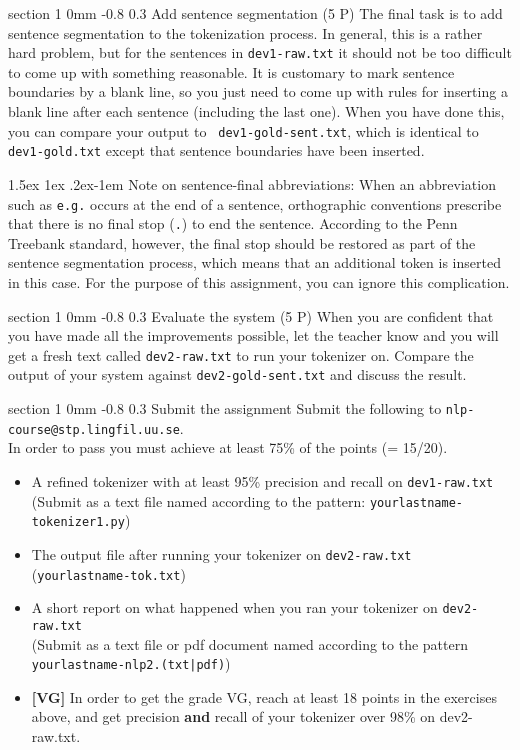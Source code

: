 \documentclass[11pt]{article}
\makeatletter
\newcommand{\newsec}[2]{\section{#1}\label{sec:#2}\noindent}
\renewcommand{\section}{\@startsection
{section}%
{1}%
{0mm}%
{-0.8\baselineskip}%
{0.3\baselineskip}%
{\bfseries\large}}%
\renewcommand{\paragraph}{%
  \@startsection{paragraph}{4}%
  {\z@}{1.5ex \@plus 1ex \@minus .2ex}{-1em}%
  {\normalfont\normalsize\bfseries}%
}\makeatother
\makeatother
\begin{document}
\newsec{Add sentence segmentation (5 P)}{sent}%
The final task is to add sentence segmentation to the tokenization
process. In general, this is a rather hard problem, but for the
sentences in {\tt dev1-raw.txt} it should not be too difficult to come
up with something reasonable. It is customary to mark sentence
boundaries by a blank line, so you just need to come up with rules for
inserting a blank line after each sentence (including the last
one). When you have done this, you can compare your output to {\tt
  dev1-gold-sent.txt}, which is identical to {\tt dev1-gold.txt}
except that sentence boundaries have been inserted.

\paragraph{Note on sentence-final abbreviations:} When an abbreviation
such as {\tt e.g.} occurs at the end of a sentence, orthographic
conventions prescribe that there is no final stop ({\tt .}) to end the
sentence. According to the Penn Treebank standard, however, the final
stop should be restored as part of the sentence segmentation process,
which means that an additional token is inserted in this case. For the
purpose of this assignment, you can ignore this complication.

\newsec{Evaluate the system (5 P)}{eval}%
When you are confident that you have made all the improvements
possible, let the teacher know and you will get a fresh text called
{\tt dev2-raw.txt} to run your tokenizer on.  Compare the output of
your system against {\tt dev2-gold-sent.txt} and discuss the result.

\newsec{Submit the assignment}{submit}%
Submit the following to {\tt nlp-course@stp.lingfil.uu.se}.\\In order
to pass you must achieve at least 75\% of the points (= 15/20). 
\begin{itemize}[noitemsep,topsep=0.2cm]
\item A refined tokenizer with at least 95\% precision and recall on {\tt dev1-raw.txt}\\
(Submit as a text file named according to the pattern: {\tt yourlastname-tokenizer1.py})
\item The output file after running your tokenizer on {\tt dev2-raw.txt} ({\tt yourlastname-tok.txt})
\item A short report on what happened when you ran your tokenizer on {\tt dev2-raw.txt}\\
(Submit as a text file or pdf document named according to the pattern {\tt yourlastname-nlp2.(txt|pdf)})
\item \textbf{[VG]} In order to get the grade VG, reach at least 18 points in the exercises above, and get precision \textbf{and} recall of your tokenizer over 98\% on dev2-raw.txt.
\end{itemize}
\end{document}
